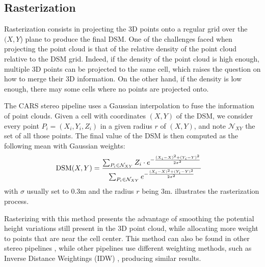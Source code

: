 \subsection{Rasterization}\label{sec:rasterization}
Rasterization consists in projecting the 3D points onto a regular grid over the $(X,Y$) plane to produce the final DSM. One of the challenges faced when projecting the point cloud is that of the relative density of the point cloud relative to the DSM grid. Indeed, if the density of the point cloud is high enough, multiple 3D points can be projected to the same cell, which raises the question on how to merge their 3D information. On the other hand, if the density is low enough, there may  some cells where no points are projected onto. 

The CARS stereo pipeline uses a Gaussian interpolation to fuse the information of point clouds. Given a cell with coordinates $(X,Y)$ of the DSM, we consider every point $P_i=(X_i, Y_i, Z_i)$ in a given radius $r$ of $(X,Y)$, and note $\mathcal{N}_{XY}$ the set of all those points. The final value of the DSM is then computed as the following mean with Gaussian weights:
\begin{align}\label{eq:rasterization}
    \mathrm{DSM}(X,Y) &= \frac{\sum_{P_i\in\mathcal{N}_{XY}}Z_i\cdot e^{-\frac{(X_i-X)^2+(Y_i-Y)^2}{2\sigma^2}}}{\sum_{P_i\in\mathcal{N}_{XY}} e^{-\frac{(X_i-X)^2+(Y_i-Y)^2}{2\sigma^2}}}
\end{align}
with $\sigma$ usually set to $0.3$m and the radius $r$ being $3$m.  illustrates the rasterization process.

Rasterizing with this method presents the advantage of smoothing the potential height variations still present in the 3D point cloud, while allocating more weight to points that are near the cell center. This method can also be found in other stereo pipelines \cite{shean_automated_2016}, while other pipelines use different weighting methods, such as Inverse Distance Weightings (IDW) \cite{rupnik_micmac_2017}, producing similar results.

